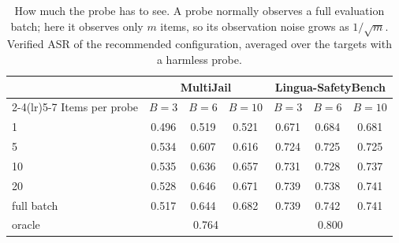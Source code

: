\begin{table}[t]
\centering
\small
\caption{How much the probe has to see. A probe normally observes a full evaluation batch; here it observes only $m$ items, so its observation noise grows as $1/\sqrt{m}$. Verified ASR of the recommended configuration, averaged over the targets with a harmless probe.}
\label{tab:sel_batch}
\begin{tabular}{lccc|ccc}
\toprule
& \multicolumn{3}{c|}{MultiJail} & \multicolumn{3}{c}{Lingua-SafetyBench} \\
\cmidrule(lr){2-4}\cmidrule(lr){5-7}
Items per probe & $B{=}3$ & $B{=}6$ & $B{=}10$ & $B{=}3$ & $B{=}6$ & $B{=}10$ \\
\midrule
1 & 0.496 & 0.519 & 0.521 & 0.671 & 0.684 & 0.681 \\
5 & 0.534 & 0.607 & 0.616 & 0.724 & 0.725 & 0.725 \\
10 & 0.535 & 0.636 & 0.657 & 0.731 & 0.728 & 0.737 \\
20 & 0.528 & 0.646 & 0.671 & 0.739 & 0.738 & 0.741 \\
full batch & 0.517 & 0.644 & 0.682 & 0.739 & 0.742 & 0.741 \\
\midrule
oracle & \multicolumn{3}{c|}{0.764} & \multicolumn{3}{c}{0.800} \\
\bottomrule
\end{tabular}
\end{table}
